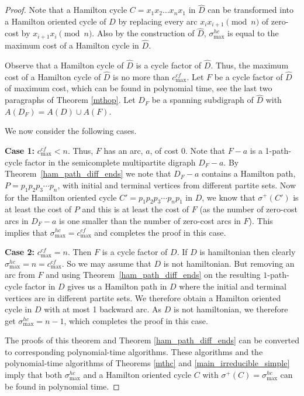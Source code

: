 \documentclass{article}
\newcommand{\QG}[1]{{#1}}
\newcommand{\GGn}[1]{{#1}}
\newcommand{\YLn}[1]{{#1}}
\newcommand{\GGnn}[1]{{#1}}
\newcommand{\2}{\vspace{0.2cm}}
\begin{document}
\begin{proof}
\QG{Note that a Hamilton cycle $C=x_1x_2\dots x_nx_1$ in $\hat{D}$ can be transformed into a Hamilton oriented cycle of $D$ by replacing every arc $x_ix_{i+1} \pmod{n} $ of zero-cost by $x_{i+1}x_i \pmod{n}$.
Also by \GGn{the construction} of $\hat{D}$, $\sigma^{hc}_{\max}$ is equal to the maximum cost of a Hamilton cycle in $\hat{D}.$


Observe that a Hamilton cycle of $\hat{D}$ is a cycle factor of $\hat{D}$. Thus, the maximum cost of a Hamilton cycle of $\hat{D}$ is no more than $c^{cf}_{\max}.$
 Let $F$ be a cycle factor of $\hat{D}$ of maximum cost, \GGn{which can be found in polynomial time, see the last two paragraphs of Theorem \ref{mthop}}.
 Let $D_F$ be a spanning subdigraph of $\hat{D}$ with $A(D_F)=A(D)\cup A(F).$} We now consider the following cases.

\vspace{2mm}
{\bf Case 1:} $c^{cf}_{\max}<n$.
\vspace{2mm}
Thus, $F$ has an arc, $a$, of cost 0. Note that $F-a$ is a 1-path-cycle factor in the semicomplete multipartite digraph $D_F-a$.
By Theorem~\ref{ham_path_diff_ends} we note that $D_F-a$ contains a Hamilton path, $P=p_1 p_2 p_3 \cdots p_n$, with initial and terminal vertices from different partite sets.
Now \QG{for the Hamilton oriented cycle $C'=p_1 p_2 p_3 \cdots p_np_1$ in $D$, we know that $\sigma^+(C')$ is at least the cost of $P$ and this is at least the cost of $F$} (as the number of zero-cost arcs in $D_F-a$ is one smaller than  the number of zero-cost arcs in $F$). This implies that  $\sigma^{hc}_{\max}=c^{cf}_{\max}$ and completes the proof in this case.


\vspace{2mm}
{\bf Case 2:} $c^{cf}_{\max}=n$.
\vspace{2mm}
Then $F$ is a cycle factor of $D$. If $D$ is \YLn{hamiltonian} then clearly $\sigma^{hc}_{\max}=n=c^{cf}_{\max}$.
So we may assume that $D$ is not \YLn{hamiltonian}. But removing an arc from $F$ and using Theorem~\ref{ham_path_diff_ends} on the resulting
$1$-path-cycle factor in $D$ gives us a Hamilton path in $D$ where the initial and terminal vertices are in different partite sets.
 We therefore obtain a Hamilton oriented cycle in $D$ with at most 1 backward arc. As $D$ is not \YLn{hamiltonian}, we therefore get
$\sigma^{hc}_{\max}=n-1$, which completes the proof in this case.

The proofs of this theorem and Theorem \ref{ham_path_diff_ends} can be converted to corresponding polynomial-time algorithms. These algorithms and the
 polynomial-time algorithms of Theorems \ref{mthc} and \ref{main_irreducible_simple} imply that both $\sigma^{hc}_{\max}$ and a Hamilton oriented cycle $C$ with  \GGnn{$\sigma^+(C)=\sigma^{hc}_{\max}$} can be found in polynomial time.
\end{proof}
	
\end{document}
